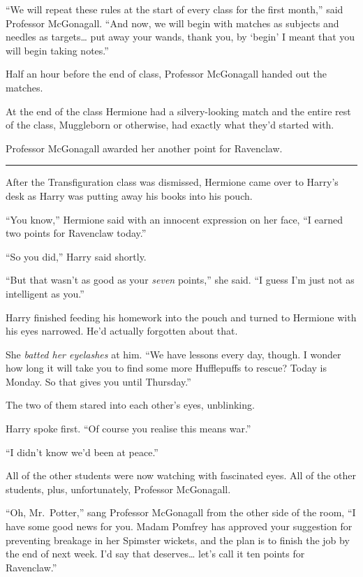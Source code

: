 ``We will repeat these rules at the start of every class for the first
month,'' said Professor McGonagall. ``And now, we will begin with
matches as subjects and needles as targets\ldots{} put away your wands,
thank you, by `begin' I meant that you will begin taking notes.''

Half an hour before the end of class, Professor McGonagall handed out
the matches.

At the end of the class Hermione had a silvery-looking match and the
entire rest of the class, Muggleborn or otherwise, had exactly what
they'd started with.

Professor McGonagall awarded her another point for Ravenclaw.

\begin{center}\rule{3in}{0.4pt}\end{center}

After the Transfiguration class was dismissed, Hermione came over to
Harry's desk as Harry was putting away his books into his pouch.

``You know,'' Hermione said with an innocent expression on her face, ``I
earned two points for Ravenclaw today.''

``So you did,'' Harry said shortly.

``But that wasn't as good as your \emph{seven} points,'' she said. ``I
guess I'm just not as intelligent as you.''

Harry finished feeding his homework into the pouch and turned to
Hermione with his eyes narrowed. He'd actually forgotten about that.

She \emph{batted her eyelashes} at him. ``We have lessons every day,
though. I wonder how long it will take you to find some more Hufflepuffs
to rescue? Today is Monday. So that gives you until Thursday.''

The two of them stared into each other's eyes, unblinking.

Harry spoke first. ``Of course you realise this means war.''

``I didn't know we'd been at peace.''

All of the other students were now watching with fascinated eyes. All of
the other students, plus, unfortunately, Professor McGonagall.

``Oh, Mr.~Potter,'' sang Professor McGonagall from the other side of the
room, ``I have some good news for you. Madam Pomfrey has approved your
suggestion for preventing breakage in her Spimster wickets, and the plan
is to finish the job by the end of next week. I'd say that
deserves\ldots{} let's call it ten points for Ravenclaw.''

